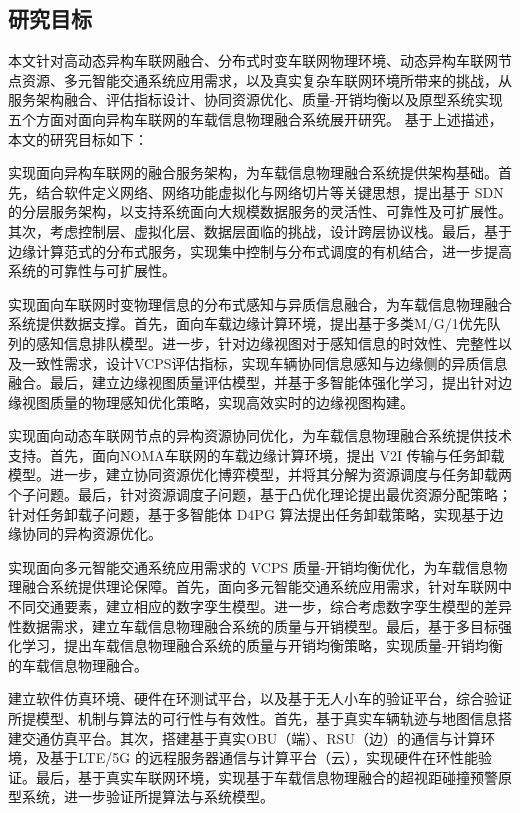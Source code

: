 \subsection{研究目标}

本文针对高动态异构车联网融合、分布式时变车联网物理环境、动态异构车联网节点资源、多元智能交通系统应用需求，以及真实复杂车联网环境所带来的挑战，从服务架构融合、评估指标设计、协同资源优化、质量-开销均衡以及原型系统实现五个方面对面向异构车联网的车载信息物理融合系统展开研究。
基于上述描述，本文的研究目标如下：

 实现面向异构车联网的融合服务架构，为车载信息物理融合系统提供架构基础。首先，结合软件定义网络、网络功能虚拟化与网络切片等关键思想，提出基于 SDN 的分层服务架构，以支持系统面向大规模数据服务的灵活性、可靠性及可扩展性。其次，考虑控制层、虚拟化层、数据层面临的挑战，设计跨层协议栈。最后，基于边缘计算范式的分布式服务，实现集中控制与分布式调度的有机结合，进一步提高系统的可靠性与可扩展性。

 实现面向车联网时变物理信息的分布式感知与异质信息融合，为车载信息物理融合系统提供数据支撑。首先，面向车载边缘计算环境，提出基于多类M/G/1优先队列的感知信息排队模型。进一步，针对边缘视图对于感知信息的时效性、完整性以及一致性需求，设计VCPS评估指标，实现车辆协同信息感知与边缘侧的异质信息融合。最后，建立边缘视图质量评估模型，并基于多智能体强化学习，提出针对边缘视图质量的物理感知优化策略，实现高效实时的边缘视图构建。

 实现面向动态车联网节点的异构资源协同优化，为车载信息物理融合系统提供技术支持。首先，面向NOMA车联网的车载边缘计算环境，提出 V2I 传输与任务卸载模型。进一步，建立协同资源优化博弈模型，并将其分解为资源调度与任务卸载两个子问题。最后，针对资源调度子问题，基于凸优化理论提出最优资源分配策略；针对任务卸载子问题，基于多智能体 D4PG 算法提出任务卸载策略，实现基于边缘协同的异构资源优化。

 实现面向多元智能交通系统应用需求的 VCPS 质量-开销均衡优化，为车载信息物理融合系统提供理论保障。首先，面向多元智能交通系统应用需求，针对车联网中不同交通要素，建立相应的数字孪生模型。进一步，综合考虑数字孪生模型的差异性数据需求，建立车载信息物理融合系统的质量与开销模型。最后，基于多目标强化学习，提出车载信息物理融合系统的质量与开销均衡策略，实现质量-开销均衡的车载信息物理融合。

 建立软件仿真环境、硬件在环测试平台，以及基于无人小车的验证平台，综合验证所提模型、机制与算法的可行性与有效性。首先，基于真实车辆轨迹与地图信息搭建交通仿真平台。其次，搭建基于真实OBU（端）、RSU（边）的通信与计算环境，及基于LTE/5G 的远程服务器通信与计算平台（云），实现硬件在环性能验证。最后，基于真实车联网环境，实现基于车载信息物理融合的超视距碰撞预警原型系统，进一步验证所提算法与系统模型。

